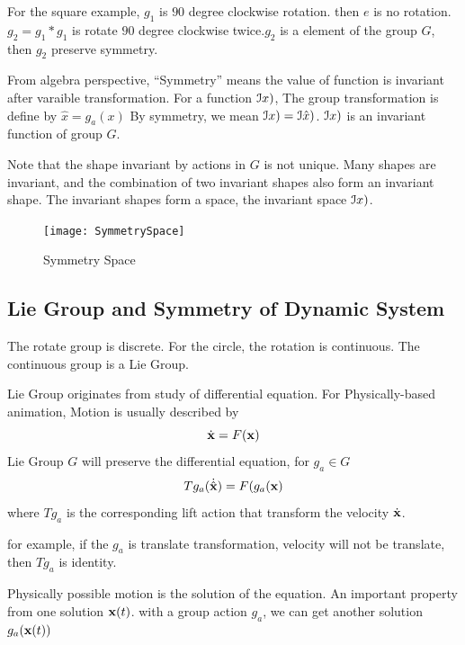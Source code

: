 For the square example, $g_1$ is  $90$ degree clockwise rotation. then $e$ is no rotation.
$g_2=g_1*g_1$ is rotate $90$ degree clockwise twice.$g_2$ is a element of the group $G$, then $g_2$ preserve symmetry.


From algebra perspective, ``Symmetry'' means the value of function is invariant after varaible transformation.
For a function $\iv (x)$,
The group transformation is define by $\hat{x}=g_a(x)$
By symmetry, we mean $\iv (x)=\iv (\hat{x})$.
$\iv(x)$ is an invariant function of group $G$.

Note that  the shape invariant by actions in $G$ is not unique.
Many shapes are invariant, and the combination of two invariant shapes also form an invariant shape. 
The invariant shapes form a space, the invariant space $\iv (x)$.


\begin{figure}[!htbp]
  \begin{center}
    \texttt{[image: SymmetrySpace]}
    \caption{Symmetry Space}
    \label{fig:symmetry Space}
\end{center}
\end{figure}





\subsection{Lie Group and Symmetry of Dynamic System}
The rotate group is discrete.
For the circle, the rotation is continuous.
The continuous group is a Lie Group.

Lie Group originates from study of differential equation.
For Physically-based animation,
Motion is usually described by
\begin{equation}
	\dot{\state}=F(\state)
\end{equation}
Lie Group $G$ will preserve the differential equation, for $g_a \in G$ 
\[
Tg_a(\dot{\hat{\state}})=F(g_a(\state)
\]
where $Tg_a$ is the corresponding lift action that transform the velocity $\dot{\state}$.

for example, if the $g_a$ is translate transformation, velocity will not be translate, then $Tg_a$ is identity.





Physically possible motion is the solution of the equation.
An important property from one solution $\state(t)$.
with a group action $g_a$, we can get another solution $g_a(\state(t))$
 	
